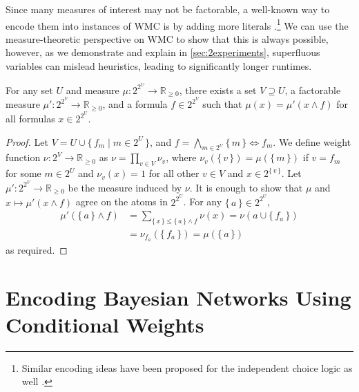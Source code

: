 Since many measures of interest may not be factorable, a well-known way to
encode them into instances of WMC is by adding more literals
\citep{DBLP:journals/ai/ChaviraD08}.\footnote{Similar encoding ideas have been
  proposed for the independent choice logic as well
  \citep{DBLP:journals/ai/Poole97,DBLP:conf/ilp/Poole08}.} We can use the
measure-theoretic perspective on WMC to show that this is always possible,
however, as we demonstrate and explain in \cref{sec:2experiments}, superfluous
variables can mislead heuristics, leading to significantly longer runtimes.

\begin{theorem}
  For any set $U$ and measure $\mu\colon 2^{2^U} \to \mathbb{R}_{\ge 0}$, there
  exists a set $V \supseteq U$, a factorable measure $\mu'\colon 2^{2^V} \to
  \mathbb{R}_{\ge 0}$, and a formula $f \in 2^{2^V}$ such that $\mu(x) = \mu'(x
  \land f)$ for all formulas $x \in 2^{2^U}$.
\end{theorem}
\begin{proof}
  Let $V = U \cup \{\, f_m \mid m \in 2^U \,\}$, and
  $f = \bigwedge_{m \in 2^U} \{\, m \,\} \Leftrightarrow f_m$. We define weight
  function $\nu\colon 2^V \to \mathbb{R}_{\ge 0}$ as
  $\nu = \prod_{v \in V} \nu_v$, where $\nu_v(\{\, v \,\}) = \mu(\{\, m \,\})$
  if $v = f_m$ for some $m \in 2^U$ and $\nu_v(x) = 1$ for all other $v \in V$
  and $x \in 2^{\{\, v \,\}}$. Let $\mu'\colon 2^{2^V} \to \mathbb{R}_{\ge 0}$
  be the measure induced by $\nu$. It is enough to show that $\mu$ and
  $x \mapsto \mu'(x \land f)$ agree on the atoms in $2^{2^U}$. For any
  $\{\, a \,\} \in 2^{2^U}$,
  \begin{align*}
    \mu'(\{\, a \,\} \land f) &= \sum_{\{\, x \,\} \le \{\, a \,\} \land f} \nu(x) = \nu(a \cup \{\, f_a \,\}) \\
                              &= \nu_{f_a}(\{\, f_a \,\}) = \mu(\{\, a \,\})
  \end{align*}
  as required.
\end{proof}

\section{Encoding Bayesian Networks Using Conditional Weights}\label{sec:bns}

